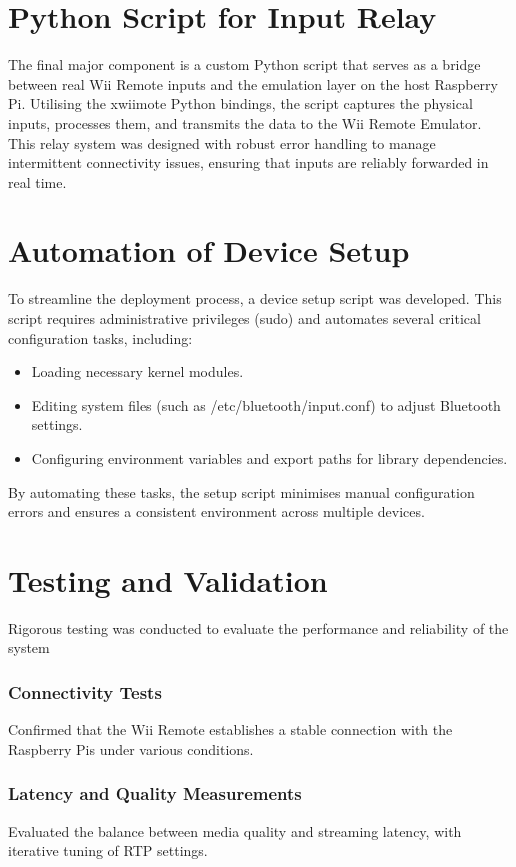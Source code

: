 \section{Python Script for Input Relay}
The final major component is a custom Python script that serves as a bridge between real Wii Remote inputs and the emulation layer on the host Raspberry Pi. Utilising the xwiimote Python bindings, the script captures the physical inputs, processes them, and transmits the data to the Wii Remote Emulator. This relay system was designed with robust error handling to manage intermittent connectivity issues, ensuring that inputs are reliably forwarded in real time.

\section{Automation of Device Setup}

To streamline the deployment process, a device setup script was developed. This script requires administrative privileges (sudo) and automates several critical configuration tasks, including:

\begin{itemize}

    \item Loading necessary kernel modules.
    \item Editing system files (such as /etc/bluetooth/input.conf) to adjust Bluetooth settings.
    \item Configuring environment variables and export paths for library dependencies.
\end{itemize}

By automating these tasks, the setup script minimises manual configuration errors and ensures a consistent environment across multiple devices.

\section{Testing and Validation}
Rigorous testing was conducted to evaluate the performance and reliability of the system

\subsubsection{Connectivity Tests}
Confirmed that the Wii Remote establishes a stable connection with the Raspberry Pis under various conditions.

\subsubsection{Latency and Quality Measurements}
Evaluated the balance between media quality and streaming latency, with iterative tuning of RTP settings.

